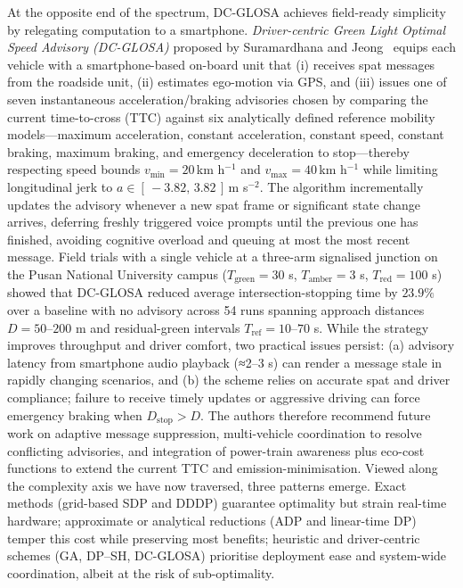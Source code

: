 At the opposite end of the spectrum, DC-GLOSA achieves field-ready simplicity by relegating computation to a smartphone. \textit{Driver-centric Green Light Optimal Speed Advisory (DC-GLOSA)} proposed by Suramardhana and Jeong~\cite{Suramardhana2014} equips each vehicle with a smartphone-based on-board unit that (i) receives \ac{spat} messages from the roadside unit, (ii) estimates ego-motion via GPS, and (iii) issues one of seven instantaneous acceleration/braking advisories chosen by comparing the current time-to-cross (TTC) against six analytically defined reference mobility models—maximum acceleration, constant acceleration, constant speed, constant braking, maximum braking, and emergency deceleration to stop—thereby respecting speed bounds $v_{\min}=20\,$km h$^{-1}$ and $v_{\max}=40\,$km h$^{-1}$ while limiting longitudinal jerk to $a\in[\,{-}3.82,\,3.82\,]\,$m s$^{-2}$. The algorithm incrementally updates the advisory whenever a new \ac{spat} frame or significant state change arrives, deferring freshly triggered voice prompts until the previous one has finished, avoiding cognitive overload and queuing at most the most recent message. Field trials with a single vehicle at a three-arm signalised junction on the Pusan National University campus ($T_{\text{green}}=30$ s, $T_{\text{amber}}=3$ s, $T_{\text{red}}=100$ s) showed that DC-GLOSA reduced average intersection-stopping time by $23.9\%$ over a baseline with no advisory across 54 runs spanning approach distances $D=50\text{–}200$ m and residual-green intervals $T_{\text{ref}}=10\text{–}70$ s. While the strategy improves throughput and driver comfort, two practical issues persist: (a) advisory latency from smartphone audio playback (≈2–3 s) can render a message stale in rapidly changing scenarios, and (b) the scheme relies on accurate \ac{spat} and driver compliance; failure to receive timely updates or aggressive driving can force emergency braking when $D_{\text{stop}}>D$. The authors therefore recommend future work on adaptive message suppression, multi-vehicle coordination to resolve conflicting advisories, and integration of power-train awareness plus eco-cost functions to extend the current TTC and emission-minimisation.
\mynewline
Viewed along the complexity axis we have now traversed, three patterns emerge. Exact methods (grid-based SDP and DDDP) guarantee optimality but strain real-time hardware; approximate or analytical reductions (ADP and linear-time DP) temper this cost while preserving most benefits; heuristic and driver-centric schemes (GA, DP–SH, DC-GLOSA) prioritise deployment ease and system-wide coordination, albeit at the risk of sub-optimality.
